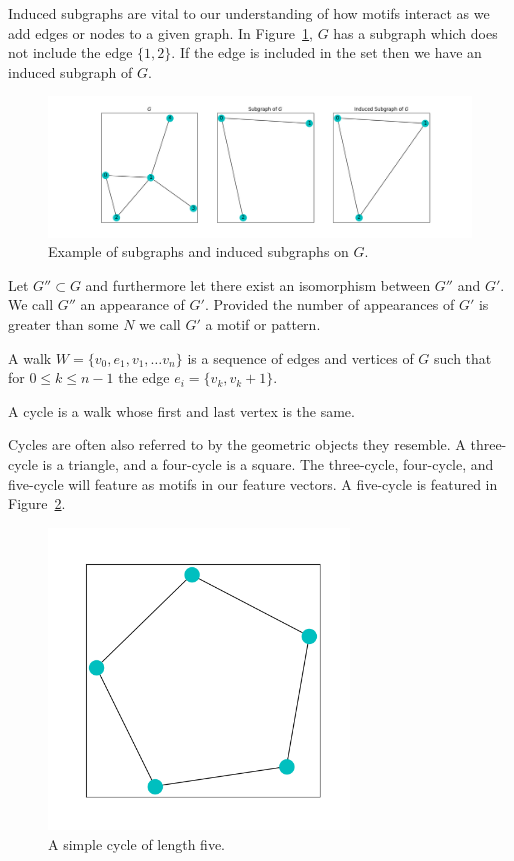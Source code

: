 \noindent Induced subgraphs are vital to our understanding of how motifs interact as we add edges or nodes
to a given graph. In Figure~\ref{fig:subgraph}, $G$ has a subgraph which does not include the edge $\{1,2\}$. If
the edge is included in the set then we have an induced subgraph of $G$.

\begin{figure}[h!]
    \includegraphics[width=16cm]{Images/subgraph.png}
    \centering
    \caption{Example of subgraphs and induced subgraphs on $G$.\label{fig:subgraph}}
\end{figure}

\begin{dfn}
    Let $G'' \subset G$ and furthermore let there exist an isomorphism between $G''$ and $G'$. We call
    $G''$ an appearance of $G'$. Provided the number of appearances of $G'$ is greater than some $N$ we call $G'$
    a motif or pattern.
\end{dfn}

\begin{dfn}
    A walk $W = \{v_0, e_1, v_1, \dots v_n\}$ is a sequence of edges and vertices of $G$ such that
    for $0 \leq k \leq n-1$ the edge $e_i = \{v_k, v_k+1\}$.
\end{dfn}

\begin{dfn}
    A cycle is a walk whose first and last vertex is the same.
\end{dfn}

Cycles are often also referred to by the geometric objects they resemble. A three-cycle is a triangle, and a four-cycle is a square.
The three-cycle, four-cycle, and five-cycle will feature as motifs in our feature vectors. A five-cycle is featured in 
Figure~\ref{fig:cycle}. 

\begin{figure}[h!]
    \includegraphics[width=8cm]{Images/Cycle.png}
    \centering
    \caption{A simple cycle of length five.\label{fig:cycle}}
\end{figure}

